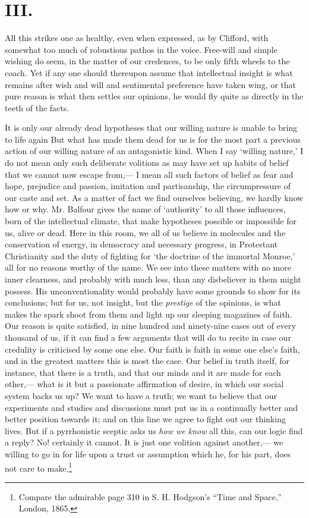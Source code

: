 \documentclass[12pt]{article}
\begin{document}
\section*{III.}

All this strikes one as healthy, even when expressed, as by Clifford, with somewhat too much of robustious pathos in the voice.  Free-will and simple wishing do seem, in the matter of our credences, to be only fifth wheels to the coach.  Yet if any one should thereupon assume that intellectual insight is what remains after wish and will and sentimental preference have taken wing, or that pure reason is what then settles our opinions, he would fly quite as directly in the teeth of the facts.

It is only our already dead hypotheses that our willing nature is unable to bring to life again  But what has made them dead for us is for the most part  a previous action of our willing nature of an antagonistic kind.  When I say `willing nature,' I do not mean only such deliberate volitions as may have set up habits of belief that we cannot now escape from,--- I mean all such factors of belief as fear and hope, prejudice and passion, imitation and partisanship, the circumpressure of our caste and set.  As a matter of fact we find ourselves believing, we hardly know how or why.  Mr. Balfour gives the name of `authority' to all those influences, born of the intellectual climate, that make hypotheses possible or impossible for us, alive or dead.  Here in this room, we all of us believe in molecules and the conservation of energy, in democracy and necessary progress, in Protestant Christianity and the duty of fighting for `the doctrine of the immortal Monroe,' all for no reasons worthy of the name.  We see into these matters with no more inner clearness, and probably with much less, than any disbeliever in them might possess.  His unconventionality would probably have some grounds to show for its conclusions; but for us, not insight, but the \emph{prestige} of the opinions, is what makes the spark shoot from them and light up our sleeping magazines of faith.  Our reason is quite satisfied, in nine hundred and ninety-nine cases out of every thousand of us, if it can find a few arguments that will do to recite in case our credulity is criticised by some one else.  Our faith is faith in some one else's faith, and in the greatest matters this is most the case.  Our belief in truth itself, for instance, that there is a truth, and that our minds and it are made for each other,--- what is it but a passionate affirmation of desire, in which our social system backs us up?  We want to have a truth; we want to believe that our  experiments and studies and discussions must put us in a continually better and better position towards it; and on this line we agree to fight out our thinking lives.  But if a pyrrhonistic sceptic asks us \emph{how we know} all this, can our logic find a reply?  No! certainly it cannot.  It is just one volition against another,--- we willing to go in for life upon a trust or assumption which he, for his part, does not care to make.\footnote{Compare the admirable page 310 in S. H. Hodgson's ``Time and Space,'' London, 1865.}
\end{document}
